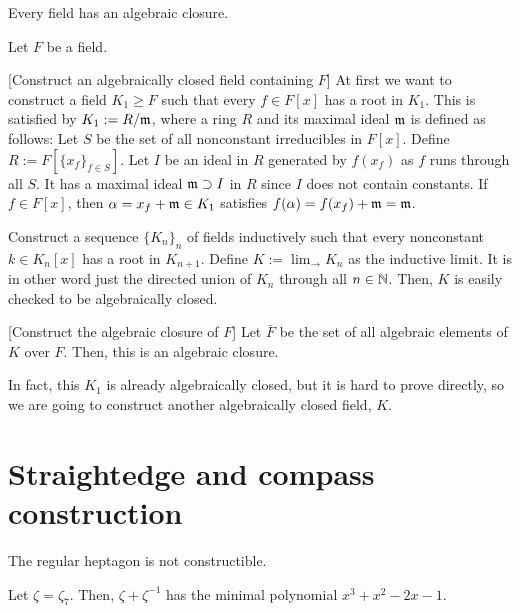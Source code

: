 \documentclass{../../large}
\begin{document}
\begin{prb}
Every field has an algebraic closure.
\end{prb}
\begin{pf}
Let $F$ be a field.

[Construct an algebraically closed field containing $F$]
At first we want to construct a field $K_1\ge F$ such that every $f\in F[x]$ has a root in $K_1$.
This is satisfied by $K_1:=R/\mathfrak{m}$, where a ring $R$ and its maximal ideal $\mathfrak{m}$ is defined as follows:
Let $S$ be the set of all nonconstant irreducibles in $F[x]$.
Define $R:=F[\{x_f\}_{f\in S}]$.
Let $I$ be an ideal in $R$ generated by $f(x_f)$ as $f$ runs through all $S$.
It has a maximal ideal $\mathfrak{m}\supset I$ in $R$ since $I$ does not contain constants.
If $f\in F[x]$, then $\alpha=x_f+\mathfrak{m}\in K_1$ satisfies $f(\alpha)=f(x_f)+\mathfrak{m}=\mathfrak{m}$.

Construct a sequence $\{K_n\}_n$ of fields inductively such that every nonconstant $k\in K_n[x]$ has a root in $K_{n+1}$.
Define $K:=\lim_{\to}K_n$ as the inductive limit.
It is in other word just the directed union of $K_n$ through all $n\in\mathbb{N}$.
Then, $K$ is easily checked to be algebraically closed.

[Construct the algebraic closure of $F$]
Let $\bar F$ be the set of all algebraic elements of $K$ over $F$.
Then, this is an algebraic closure.
\end{pf}
\begin{rmk}
In fact, this $K_1$ is already algebraically closed, but it is hard to prove directly, so we are going to construct another algebraically closed field, $K$.
\end{rmk}


\section{Straightedge and compass construction}
\begin{prb}
\begin{parts}
\item The regular heptagon is not constructible.
\end{parts}
\end{prb}
\begin{pf}
Let $\zeta=\zeta_7$.
Then, $\zeta+\zeta^{-1}$ has the minimal polynomial $x^3+x^2-2x-1$.
\end{pf}

\begin{prb}

\end{prb}
\end{document}
